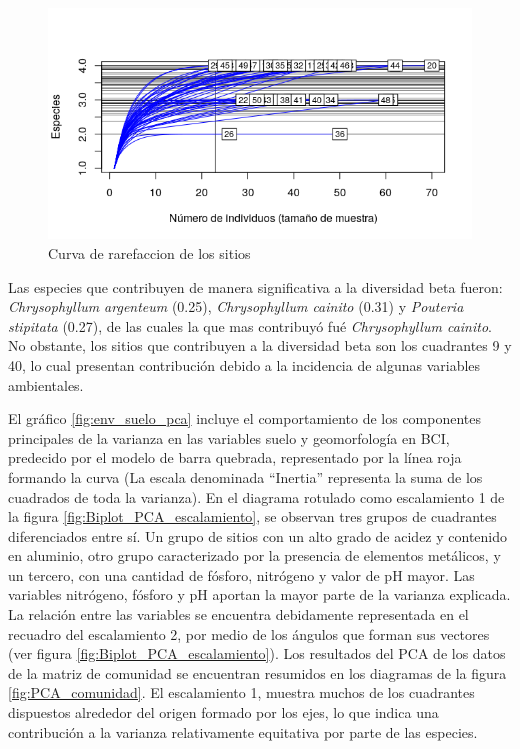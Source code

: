 \documentclass[11pt,]{article}
\begin{document}
\begin{figure}
\centering
\includegraphics{Curva_rarefaccion.png}
\caption{Curva de rarefaccion de los sitios
\label{fig:Curva_rarefaccion}}
\end{figure}

Las especies que contribuyen de manera significativa a la diversidad
beta fueron: \emph{Chrysophyllum argenteum} (0.25), \emph{Chrysophyllum
cainito} (0.31) y \emph{Pouteria stipitata} (0.27), de las cuales la que
mas contribuyó fué \emph{Chrysophyllum cainito}. No obstante, los sitios
que contribuyen a la diversidad beta son los cuadrantes 9 y 40, lo cual
presentan contribución debido a la incidencia de algunas variables
ambientales.

El gráfico \ref{fig:env_suelo_pca} incluye el comportamiento de los
componentes principales de la varianza en las variables suelo y
geomorfología en BCI, predecido por el modelo de barra quebrada,
representado por la línea roja formando la curva (La escala denominada
``Inertia'' representa la suma de los cuadrados de toda la varianza). En
el diagrama rotulado como escalamiento 1 de la figura
\ref{fig:Biplot_PCA_escalamiento}, se observan tres grupos de cuadrantes
diferenciados entre sí. Un grupo de sitios con un alto grado de acidez y
contenido en aluminio, otro grupo caracterizado por la presencia de
elementos metálicos, y un tercero, con una cantidad de fósforo,
nitrógeno y valor de pH mayor. Las variables nitrógeno, fósforo y pH
aportan la mayor parte de la varianza explicada. La relación entre las
variables se encuentra debidamente representada en el recuadro del
escalamiento 2, por medio de los ángulos que forman sus vectores (ver
figura \ref{fig:Biplot_PCA_escalamiento}). Los resultados del PCA de los
datos de la matriz de comunidad se encuentran resumidos en los diagramas
de la figura \ref{fig:PCA_comunidad}. El escalamiento 1, muestra muchos
de los cuadrantes dispuestos alrededor del origen formado por los ejes,
lo que indica una contribución a la varianza relativamente equitativa
por parte de las especies.
\end{document}
